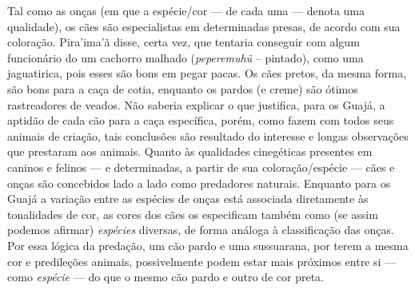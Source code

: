 Tal como as onças (em que a espécie/cor --- de cada uma --- denota uma
qualidade), os cães são especialistas em determinadas presas, de acordo
com sua coloração. Pira'ima'ã disse, certa vez, que tentaria conseguir
com algum funcionário do  um cachorro malhado (\emph{peperemuhũ} --
pintado), como uma jaguatirica, pois esses são bons em pegar pacas. Os
cães pretos, da mesma forma, são bons para a caça de cotia, enquanto os
pardos (e creme) são ótimos rastreadores de veados. Não saberia explicar
o que justifica, para os Guajá, a aptidão de cada cão para a caça
específica, porém, como fazem com todos seus animais de criação, tais
conclusões são resultado do interesse e longas observações que prestaram
aos animais. Quanto às qualidades cinegéticas presentes em caninos e
felinos --- e determinadas, a partir de sua coloração/espécie --- cães e
onças são concebidos lado a lado como predadores naturais. Enquanto para
os Guajá a variação entre as espécies de onças está associada
diretamente às tonalidades de cor, as cores dos cães os especificam
também como (se assim podemos afirmar) \emph{espécies} diversas, de
forma análoga à classificação das onças. Por essa lógica da predação, um
cão pardo e uma sussuarana, por terem a mesma cor e predileções animais,
possivelmente podem estar mais próximos entre si --- como \emph{espécie} ---
do que o mesmo cão pardo e outro de cor preta.

